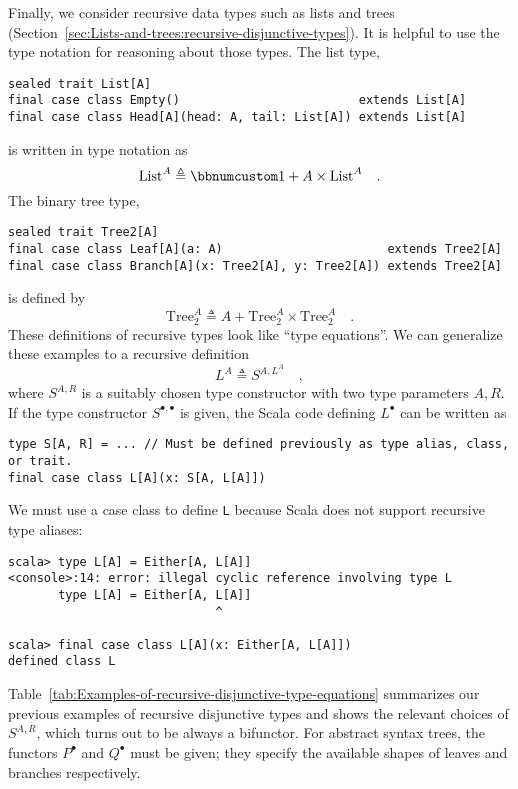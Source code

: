 Finally, we consider recursive data types such as lists and trees
(Section~\ref{sec:Lists-and-trees:recursive-disjunctive-types}).
It is helpful to use the type notation for reasoning about those types.
The list type,
\begin{lstlisting}
sealed trait List[A]
final case class Empty()                         extends List[A]
final case class Head[A](head: A, tail: List[A]) extends List[A]
\end{lstlisting}
is written in type notation as
\[
\text{List}^{A}\triangleq\bbnum 1+A\times\text{List}^{A}\quad.
\]
The binary tree type,
\begin{lstlisting}
sealed trait Tree2[A]
final case class Leaf[A](a: A)                       extends Tree2[A]
final case class Branch[A](x: Tree2[A], y: Tree2[A]) extends Tree2[A]
\end{lstlisting}
is defined by
\[
\text{Tree}_{2}^{A}\triangleq A+\text{Tree}_{2}^{A}\times\text{Tree}_{2}^{A}\quad.
\]
These definitions of recursive types look like ``type equations''.
We can generalize these examples to a recursive definition
\begin{equation}
L^{A}\triangleq S^{A,L^{A}}\quad,\label{eq:f-def-recursive-functor}
\end{equation}
where $S^{A,R}$ is a suitably chosen type constructor with two type
parameters $A,R$. If the type constructor $S^{\bullet,\bullet}$
is given, the Scala code defining $L^{\bullet}$ can be written as
\begin{lstlisting}
type S[A, R] = ... // Must be defined previously as type alias, class, or trait.
final case class L[A](x: S[A, L[A]])
\end{lstlisting}
We must use a case class to define \lstinline!L! because Scala does
not support recursive type aliases:
\begin{lstlisting}
scala> type L[A] = Either[A, L[A]]
<console>:14: error: illegal cyclic reference involving type L
       type L[A] = Either[A, L[A]]
                             ^

scala> final case class L[A](x: Either[A, L[A]])
defined class L
\end{lstlisting}

Table~\ref{tab:Examples-of-recursive-disjunctive-type-equations}
summarizes our previous examples of recursive disjunctive types and
shows the relevant choices of $S^{A,R}$, which turns out to be always
a bifunctor. For abstract syntax trees, the functors $P^{\bullet}$
and $Q^{\bullet}$ must be given; they specify the available shapes
of leaves and branches respectively. 

